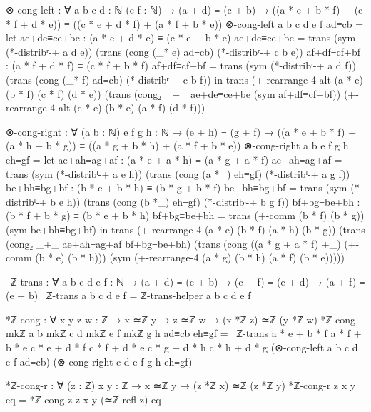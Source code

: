 \documentclass[11pt,a4paper]{book}
\begin{document}
\begin{code}
⊗-cong-left : ∀ {a b c d : ℕ} (e f : ℕ)
            → (a + d) ≡ (c + b)
            → ((a * e + b * f) + (c * f + d * e)) ≡ ((c * e + d * f) + (a * f + b * e))
⊗-cong-left {a} {b} {c} {d} e f ad≡cb =
  let ae+de≡ce+be : (a * e + d * e) ≡ (c * e + b * e)
      ae+de≡ce+be = trans (sym (*-distribʳ-+ a d e)) 
                          (trans (cong (_* e) ad≡cb) 
                                 (*-distribʳ-+ c b e))
      af+df≡cf+bf : (a * f + d * f) ≡ (c * f + b * f)
      af+df≡cf+bf = trans (sym (*-distribʳ-+ a d f))
                          (trans (cong (_* f) ad≡cb)
                                 (*-distribʳ-+ c b f))
  in trans (+-rearrange-4-alt (a * e) (b * f) (c * f) (d * e))
           (trans (cong₂ _+_ ae+de≡ce+be (sym af+df≡cf+bf))
                  (+-rearrange-4-alt (c * e) (b * e) (a * f) (d * f)))

⊗-cong-right : ∀ (a b : ℕ) {e f g h : ℕ}
             → (e + h) ≡ (g + f)
             → ((a * e + b * f) + (a * h + b * g)) ≡ ((a * g + b * h) + (a * f + b * e))
⊗-cong-right a b {e} {f} {g} {h} eh≡gf =
  let ae+ah≡ag+af : (a * e + a * h) ≡ (a * g + a * f)
      ae+ah≡ag+af = trans (sym (*-distribˡ-+ a e h))
                          (trans (cong (a *_) eh≡gf)
                                 (*-distribˡ-+ a g f))
      be+bh≡bg+bf : (b * e + b * h) ≡ (b * g + b * f)
      be+bh≡bg+bf = trans (sym (*-distribˡ-+ b e h))
                          (trans (cong (b *_) eh≡gf)
                                 (*-distribˡ-+ b g f))
      bf+bg≡be+bh : (b * f + b * g) ≡ (b * e + b * h)
      bf+bg≡be+bh = trans (+-comm (b * f) (b * g)) (sym be+bh≡bg+bf)
  in trans (+-rearrange-4 (a * e) (b * f) (a * h) (b * g))
           (trans (cong₂ _+_ ae+ah≡ag+af bf+bg≡be+bh)
                  (trans (cong ((a * g + a * f) +_) (+-comm (b * e) (b * h)))
                         (sym (+-rearrange-4 (a * g) (b * h) (a * f) (b * e)))))

~ℤ-trans : ∀ {a b c d e f : ℕ} → (a + d) ≡ (c + b) → (c + f) ≡ (e + d) → (a + f) ≡ (e + b)
~ℤ-trans {a} {b} {c} {d} {e} {f} = ℤ-trans-helper a b c d e f

*ℤ-cong : ∀ {x y z w : ℤ} → x ≃ℤ y → z ≃ℤ w → (x *ℤ z) ≃ℤ (y *ℤ w)
*ℤ-cong {mkℤ a b} {mkℤ c d} {mkℤ e f} {mkℤ g h} ad≡cb eh≡gf =
  ~ℤ-trans {a * e + b * f} {a * f + b * e}
           {c * e + d * f} {c * f + d * e}
           {c * g + d * h} {c * h + d * g}
           (⊗-cong-left {a} {b} {c} {d} e f ad≡cb)
           (⊗-cong-right c d {e} {f} {g} {h} eh≡gf)

*ℤ-cong-r : ∀ (z : ℤ) {x y : ℤ} → x ≃ℤ y → (z *ℤ x) ≃ℤ (z *ℤ y)
*ℤ-cong-r z {x} {y} eq = *ℤ-cong {z} {z} {x} {y} (≃ℤ-refl z) eq


\end{code}
\end{document}
